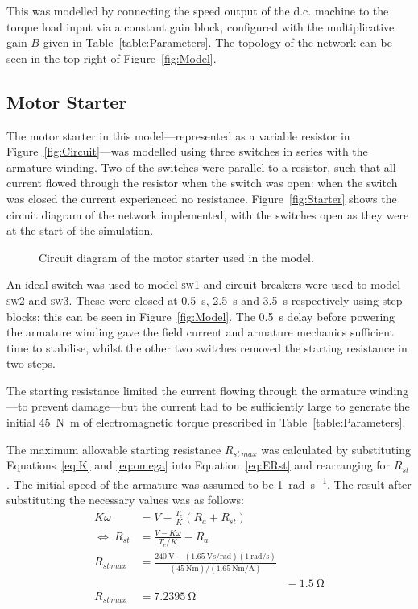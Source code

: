\documentclass[a4paper,11pt,twocolumn]{article}
\newcommand{\s}{\si{\second}\xspace}
\newcommand{\V}{\si{\volt}\xspace}
\newcommand{\Ohm}{\si{\ohm}\xspace}
\newcommand{\Nm}{\si{\newton\metre}\xspace}
\newcommand{\rps}{\si{\radian\per\second}\xspace}
\newcommand{\Vspr}{\si{\volt\second\per\radian}\xspace}
\newcommand{\NmpA}{\si{\newton\metre\per\ampere}\xspace}
\newcommand{\DC}{d.c.\xspace}
\newcommand{\SW}[1]{\textsc{sw\footnotesize#1}\xspace}
\begin{document}
This was modelled by connecting the speed output of the \DC machine to the 
torque load input via a constant gain block, configured with the multiplicative 
gain $B$ given in Table~\ref{table:Parameters}. The topology of the network can 
be seen in the top-right of Figure~\ref{fig:Model}.

\subsection{Motor Starter} \label{sec:MotorStarter}

The motor starter in this model---represented as a variable resistor in 
Figure~\ref{fig:Circuit}---was modelled using three switches in series with the 
armature winding. Two of the switches were parallel to a resistor, such that 
all current flowed through the resistor when the switch was open: when the 
switch was closed the current experienced no resistance. 
Figure~\vref{fig:Starter} shows the circuit diagram of the network implemented, 
with the switches open as they were at the start of the simulation.
\begin{figure}[h]
    \centering
    \def\svgwidth{0.48\textwidth}
    
    \caption{Circuit diagram of the motor starter used in the model.}
    \label{fig:Starter}
\end{figure}

An ideal switch was used to model \SW{1} and circuit breakers were used to 
model \SW{2} and \SW{3}. These were closed at 0.5~\s, 2.5~\s and 3.5~\s 
respectively using step blocks; this can be seen in Figure~\vref{fig:Model}. 
The 0.5~\s delay before powering the armature winding gave the field current 
and armature mechanics sufficient time to stabilise, whilst the other two 
switches removed the starting resistance in two steps.

The starting resistance limited the current flowing through the armature 
winding---to prevent damage---but the current had to be sufficiently large to 
generate the initial 45~\Nm of electromagnetic torque prescribed in 
Table~\ref{table:Parameters}.

The maximum allowable starting resistance $R_{st\,max}$ was calculated by 
substituting Equations~\ref{eq:K} and \ref{eq:omega} into 
Equation~\ref{eq:ERst} and rearranging for $R_{st}$. The initial speed of the 
armature was assumed to be 1~\rps. The result after substituting the necessary 
values was as follows:
\begin{align*}
    K \omega &= V - \frac{T_e}{K}(R_a + R_{st}) \\
    \Leftrightarrow~ R_{st} &= \frac{V - K\omega}{T_e/K} - R_a \\
    R_{st\,max} &= \frac{240~\V - (1.65~\Vspr)(1~\rps)}{(45~\Nm)/(1.65~\NmpA)}\\
        &\hspace{13em} - 1.5~\Ohm \\
    R_{st\,max} &= 7.2395~\Ohm
\end{align*}
\end{document}
